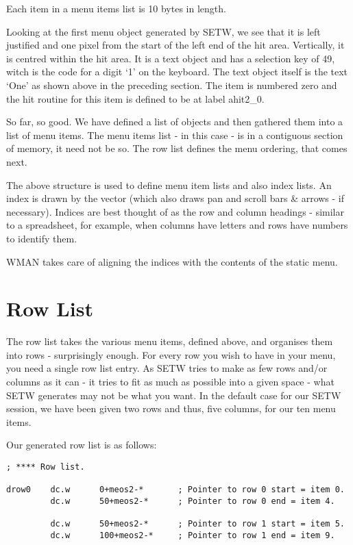  


Each item in a menu items list is 10 bytes in length.

Looking at the first menu object generated by
 SETW, we see that it is left justified and one
    pixel from the start of the left end of the hit area. Vertically, it is
    centred within the hit area. It is a text object and has a selection key
    of 49, witch is the code for a digit `1' on the keyboard. The text object
    itself is the text `One' as shown above in the preceding section. The item
    is numbered zero and the hit routine for this item is defined to be at
    label ahit2\_0.

So far, so good. We have defined a list of objects and then gathered
    them into a list of menu items. The menu items list -{} in this case -{} is in
    a contiguous section of memory, it need not be so. The row list defines
    the menu ordering, that comes next.

The above structure is used to define menu item lists and also index
    lists. An index is drawn by the  vector (which also draws pan and
    scroll bars \& arrows -{} if necessary). Indices are best thought of as
    the row and column headings -{} similar to a spreadsheet, for example, when
    columns have letters and rows have numbers to identify them.

WMAN takes
    care of aligning the indices with the contents of the static menu.

\section{Row List}
\label{ch29-app-menu-row-list}%

The row list takes the various menu items, defined above, and
    organises them into rows -{} surprisingly enough. For every row you wish to
    have in your menu, you need a single row list entry. As SETW tries to make
    as few rows and/or columns as it can -{} it tries to fit as much as possible
    into a given space -{} what SETW generates may not be what you want. In the
    default case for our SETW session, we have been given two rows and thus,
    five columns, for our ten menu items.

Our generated row list is as follows:

\begin{lstlisting}[firstnumber=last,caption={AppMenuTest1Win\_asm - Row List}]
; **** Row list.

drow0    dc.w      0+meos2-*       ; Pointer to row 0 start = item 0.
         dc.w      50+meos2-*      ; Pointer to row 0 end = item 4.

         dc.w      50+meos2-*      ; Pointer to row 1 start = item 5.
         dc.w      100+meos2-*     ; Pointer to row 1 end = item 9.
\end{lstlisting}


